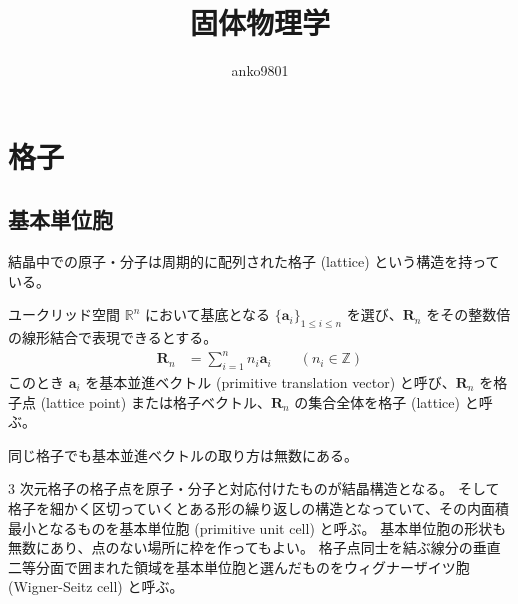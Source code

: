 \documentclass[uplatex,dvipdfmx,a4paper,11pt]{jlreq}
\title{固体物理学}
\author{anko9801}
\newcommand{\RR}{\mathbb{R}}
\newcommand{\ZZ}{\mathbb{Z}}
\newcommand{\R}{\bm{R}}
\renewcommand{\aa}{\bm{a}}
\numberwithin{equation}{section}
\theoremstyle{definition}
\begin{document}
\maketitle
\tableofcontents
\clearpage

\section{格子}

\subsection{基本単位胞}
結晶中での原子・分子は周期的に配列された格子 (lattice) という構造を持っている。
\begin{definition}[格子]
  ユークリッド空間 $\RR^n$ において基底となる $\{\aa_i\}_{1\leq i\leq n}$ を選び、$\R_n$ をその整数倍の線形結合で表現できるとする。
  \begin{align}
    \R_n & = \sum_{i = 1}^n n_i\aa_i \qquad (n_i\in\ZZ)
  \end{align}
  このとき $\aa_i$ を基本並進ベクトル (primitive translation vector) と呼び、$\R_n$ を格子点 (lattice point) または格子ベクトル、$\R_n$ の集合全体を格子 (lattice) と呼ぶ。
\end{definition}
\begin{theorem}
  同じ格子でも基本並進ベクトルの取り方は無数にある。\\
\end{theorem}

3 次元格子の格子点を原子・分子と対応付けたものが結晶構造となる。
そして格子を細かく区切っていくとある形の繰り返しの構造となっていて、その内面積最小となるものを基本単位胞 (primitive unit cell) と呼ぶ。
基本単位胞の形状も無数にあり、点のない場所に枠を作ってもよい。
格子点同士を結ぶ線分の垂直二等分面で囲まれた領域を基本単位胞と選んだものをウィグナーザイツ胞 (Wigner-Seitz cell) と呼ぶ。 \\
\end{document}
